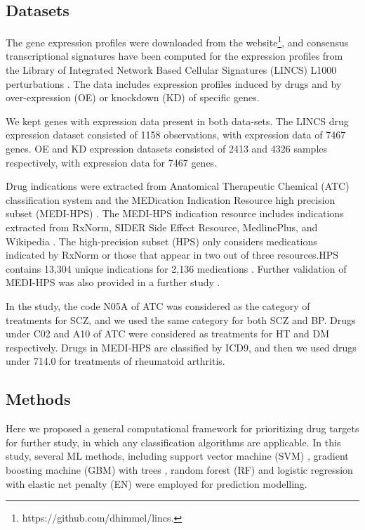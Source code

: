   \subsection{Datasets}
    The gene expression profiles were downloaded from the website\footnote{https://github.com/dhimmel/lincs.}, and consensus transcriptional signatures have been computed for the expression profiles from the Library of Integrated Network Based Cellular Signatures (LINCS) L1000 perturbations \cite{subramanian2017next}. The data includes expression profiles induced by drugs and by over-expression (OE) or knockdown (KD) of specific genes. 

    We kept genes with expression data present in both data-sets. The LINCS drug expression dataset consisted of 1158 observations, with expression data of 7467 genes. OE and KD expression datasets consisted of 2413 and 4326 samples respectively, with expression data for 7467 genes. 

    Drug indications were extracted from Anatomical Therapeutic Chemical (ATC) classification system and the MEDication Indication Resource high precision subset (MEDI-HPS) \cite{wei2013development}. The MEDI-HPS indication resource includes indications extracted from RxNorm, SIDER Side Effect Resource, MedlinePlus, and Wikipedia \cite{wei2013development}. The high-precision subset (HPS) only considers medications indicated by RxNorm or those that appear in two out of three resources.HPS contains 13,304 unique indications for 2,136 medications \cite{wei2013development}. Further validation of MEDI-HPS was also provided in a further study \cite{wei2013validation}. 

    In the study, the code N05A of ATC was considered as the category of treatments for SCZ, and we used the same category for both SCZ and BP. Drugs under C02 and A10 of ATC were considered as treatments for HT and DM respectively. Drugs in MEDI-HPS are classified by ICD9, and then we used drugs under 714.0 for treatments of rheumatoid arthritis.

  \subsection{Methods}
    Here we proposed a general computational framework for prioritizing drug targets for further study, in which any classification algorithms are applicable. In this study, several ML methods, including support vector machine (SVM) \cite{cortes1995support}, gradient boosting machine (GBM) with trees \cite{friedman2001greedy}, random forest (RF) \cite{breiman2001random} and logistic regression with elastic net penalty (EN) \cite{zou2005regularization} were employed for prediction modelling. 

